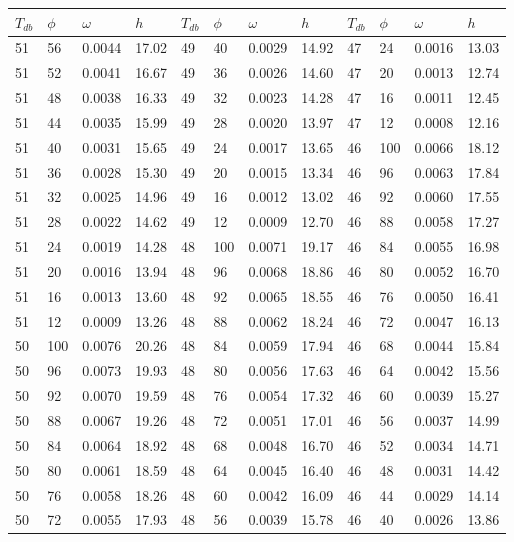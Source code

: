 \begin{tabular}{llll|llll|llll}
 \toprule 
\(T_{db}\) & \(\phi\) & \(\omega\) & \(h\) & \(T_{db}\) & \(\phi\) & \(\omega\) & \(h\) & \(T_{db}\) & \(\phi\) & \(\omega\) & \(h\)  \\ \midrule 
51 & 56 & 0.0044 & 17.02 & 49 & 40 & 0.0029 & 14.92 & 47 & 24 & 0.0016 & 13.03\\
51 & 52 & 0.0041 & 16.67 & 49 & 36 & 0.0026 & 14.60 & 47 & 20 & 0.0013 & 12.74\\
51 & 48 & 0.0038 & 16.33 & 49 & 32 & 0.0023 & 14.28 & 47 & 16 & 0.0011 & 12.45\\
51 & 44 & 0.0035 & 15.99 & 49 & 28 & 0.0020 & 13.97 & 47 & 12 & 0.0008 & 12.16\\
51 & 40 & 0.0031 & 15.65 & 49 & 24 & 0.0017 & 13.65 & 46 & 100 & 0.0066 & 18.12\\
51 & 36 & 0.0028 & 15.30 & 49 & 20 & 0.0015 & 13.34 & 46 & 96 & 0.0063 & 17.84\\
51 & 32 & 0.0025 & 14.96 & 49 & 16 & 0.0012 & 13.02 & 46 & 92 & 0.0060 & 17.55\\
51 & 28 & 0.0022 & 14.62 & 49 & 12 & 0.0009 & 12.70 & 46 & 88 & 0.0058 & 17.27\\
51 & 24 & 0.0019 & 14.28 & 48 & 100 & 0.0071 & 19.17 & 46 & 84 & 0.0055 & 16.98\\
51 & 20 & 0.0016 & 13.94 & 48 & 96 & 0.0068 & 18.86 & 46 & 80 & 0.0052 & 16.70\\
51 & 16 & 0.0013 & 13.60 & 48 & 92 & 0.0065 & 18.55 & 46 & 76 & 0.0050 & 16.41\\
51 & 12 & 0.0009 & 13.26 & 48 & 88 & 0.0062 & 18.24 & 46 & 72 & 0.0047 & 16.13\\
50 & 100 & 0.0076 & 20.26 & 48 & 84 & 0.0059 & 17.94 & 46 & 68 & 0.0044 & 15.84\\
50 & 96 & 0.0073 & 19.93 & 48 & 80 & 0.0056 & 17.63 & 46 & 64 & 0.0042 & 15.56\\
50 & 92 & 0.0070 & 19.59 & 48 & 76 & 0.0054 & 17.32 & 46 & 60 & 0.0039 & 15.27\\
50 & 88 & 0.0067 & 19.26 & 48 & 72 & 0.0051 & 17.01 & 46 & 56 & 0.0037 & 14.99\\
50 & 84 & 0.0064 & 18.92 & 48 & 68 & 0.0048 & 16.70 & 46 & 52 & 0.0034 & 14.71\\
50 & 80 & 0.0061 & 18.59 & 48 & 64 & 0.0045 & 16.40 & 46 & 48 & 0.0031 & 14.42\\
50 & 76 & 0.0058 & 18.26 & 48 & 60 & 0.0042 & 16.09 & 46 & 44 & 0.0029 & 14.14\\
50 & 72 & 0.0055 & 17.93 & 48 & 56 & 0.0039 & 15.78 & 46 & 40 & 0.0026 & 13.86\\

\end{tabular}
